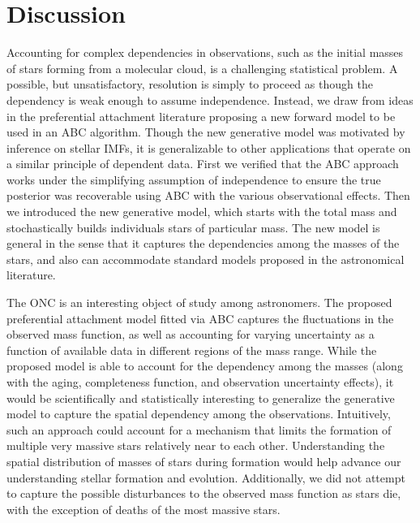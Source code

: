\documentclass[12pt]{article}
\begin{document}
\section{Discussion}
\label{discussionSec}

Accounting for complex dependencies in observations, such as the initial masses of stars forming from a molecular cloud, is a challenging statistical problem.  A possible, but unsatisfactory, resolution is simply to proceed as though the dependency is weak enough to assume independence.  Instead, we draw from ideas in the preferential attachment literature proposing a new forward model to be used in an ABC algorithm.  
Though the new generative model was motivated by inference on stellar IMFs, it is generalizable to other applications that operate on a similar principle of dependent data.
First we verified that the ABC approach works under the simplifying assumption of independence to ensure the true posterior was recoverable using ABC with the various observational effects.  Then we introduced the new generative model, which starts with the total mass and stochastically builds individuals stars of particular mass.  The new model is general in the sense that it captures the dependencies among the masses of the stars, and also can accommodate standard models proposed in the astronomical literature.

The ONC is an interesting object of study among astronomers. 
The proposed preferential attachment model fitted via ABC captures the fluctuations in the observed mass function, as well as accounting for varying uncertainty as a function of available data in different regions of the mass range.  
While the proposed model is able to account for the dependency among the masses (along with the aging, completeness function, and observation uncertainty effects), it would be scientifically and statistically interesting to generalize the generative model to capture the spatial dependency among the observations.  
Intuitively, such an approach could account for a mechanism that limits the formation of multiple very massive stars relatively near to each other.  
Understanding the spatial distribution of masses of stars during formation would help advance our understanding stellar formation and evolution.  
Additionally, we did not attempt to capture the possible disturbances to the observed mass function as stars die, with the exception of deaths of the most massive stars.  
\end{document}
